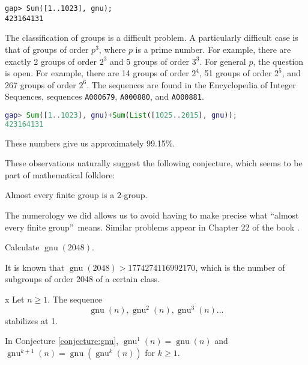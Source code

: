 \begin{lstlisting}
gap> Sum([1..1023], gnu);
423164131
\end{lstlisting}

The classification of groups is a difficult problem. A particularly difficult case is that of groups of order $p^3$, where $p$ is a prime number. For example, there are exactly 2 groups of order $2^3$ and 5 groups of order $3^3$. For general $p$, the question is open. For example, there are 14 groups of order $2^4$, 51 groups of order $2^5$, and 267 groups of order $2^6$. The sequences are found in the Encyclopedia of Integer Sequences, sequences \lstinline{A000679}, \lstinline{A000880}, and \lstinline{A000881}.


\begin{lstlisting}[language=gap]
gap> Sum([1..1023], gnu)+Sum(List([1025..2015], gnu));
423164131
\end{lstlisting}

These numbers give us approximately 99.15\%.

These observations naturally suggest the following conjecture, which seems to be part of mathematical folklore:

\begin{conjecture}
Almost every finite group is a $2$-group.
\end{conjecture}

The numerology we did allows us to avoid having to make precise what \textquotedblleft almost every finite group\textquotedblright\ means. Similar problems appear in Chapter 22 of the book \cite{MR2382539}.

\begin{problem}
Calculate $\operatorname{gnu}(2048)$.
\end{problem}

It is known that $\operatorname{gnu}(2048)>1774274116992170$, which is the number of subgroups of order 2048 of a certain class.

\begin{conjecture}
\label{conjecture:gnu}x
Let $n\geq1$. The sequence
\[
\operatorname{gnu}(n),\operatorname{gnu}^2(n),\operatorname{gnu}^3(n)\dots
\]
stabilizes at 1.
\end{conjecture}

In Conjecture \ref{conjecture:gnu}, 
$\operatorname{gnu}^{1}(n)=\operatorname{gnu}(n)$ and 
$\operatorname{gnu}^{k+1}(n)=\operatorname{gnu}(\operatorname{gnu}^k(n))$ for $k\geq1$. 

